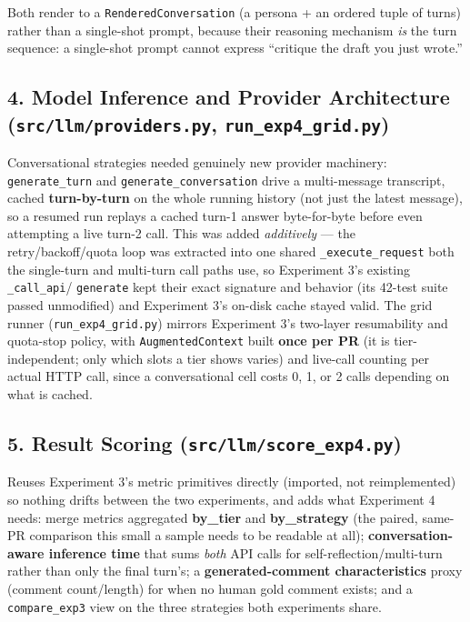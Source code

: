 \documentclass{experimentreport}
\begin{document}
{Both render to a \texttt{RenderedConversation} (a persona + an ordered tuple of turns) rather than a
single-shot prompt, because their reasoning mechanism \emph{is} the turn sequence: a single-shot
prompt cannot express ``critique the draft you just wrote.''

\subsection*{4. Model Inference and Provider Architecture (\texttt{src/llm/providers.py}, \texttt{run\_exp4\_grid.py})}

Conversational strategies needed genuinely new provider machinery: \texttt{generate\_turn} and
\texttt{generate\_conversation} drive a multi-message transcript, cached \textbf{turn-by-turn} on the
whole running history (not just the latest message), so a resumed run replays a cached turn-1 answer
byte-for-byte before even attempting a live turn-2 call. This was added \emph{additively} --- the
retry/backoff/quota loop was extracted into one shared \texttt{\_execute\_request} both the
single-turn and multi-turn call paths use, so Experiment 3's existing \texttt{\_call\_api}/
\texttt{generate} kept their exact signature and behavior (its 42-test suite passed unmodified) and
Experiment 3's on-disk cache stayed valid. The grid runner (\texttt{run\_exp4\_grid.py}) mirrors
Experiment 3's two-layer resumability and quota-stop policy, with \texttt{AugmentedContext} built
\textbf{once per PR} (it is tier-independent; only which slots a tier shows varies) and live-call
counting per actual HTTP call, since a conversational cell costs 0, 1, or 2 calls depending on what
is cached.

\subsection*{5. Result Scoring (\texttt{src/llm/score\_exp4.py})}

Reuses Experiment 3's metric primitives directly (imported, not reimplemented) so nothing drifts
between the two experiments, and adds what Experiment 4 needs: merge metrics aggregated
\textbf{by\_tier} and \textbf{by\_strategy} (the paired, same-PR comparison this small a sample needs
to be readable at all); \textbf{conversation-aware inference time} that sums \emph{both} API calls
for self-reflection/multi-turn rather than only the final turn's; a \textbf{generated-comment
characteristics} proxy (comment count/length) for when no human gold comment exists; and a
\texttt{compare\_exp3} view on the three strategies both experiments share.

}
\end{document}
